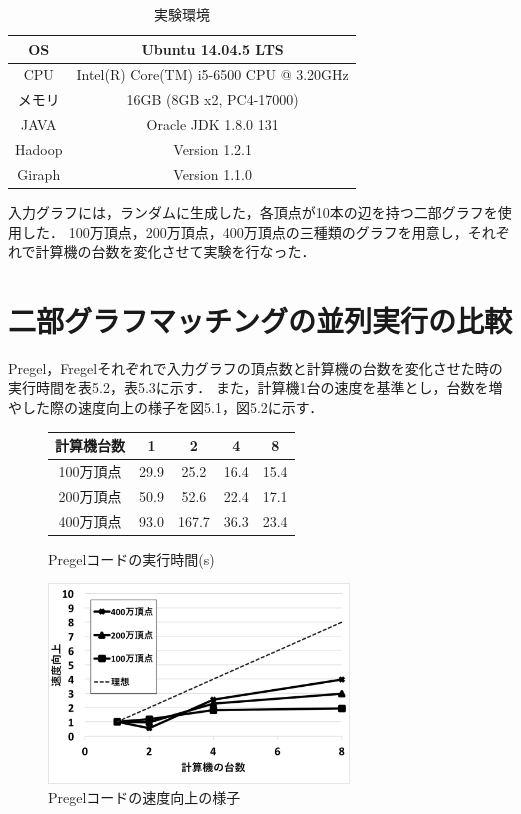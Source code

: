 \documentclass[12pt]{ujreport}
\begin{document}
\begin{table}[htb]
  \caption{実験環境}
  \centering
  \begin{tabular}{|c||c|} \hline
    OS & Ubuntu 14.04.5 LTS\\ \hline
    CPU & Intel(R) Core(TM) i5-6500 CPU @ 3.20GHz\\ \hline
    メモリ & 16GB (8GB x2, PC4-17000)\\ \hline
    JAVA & Oracle JDK 1.8.0 131\\ \hline
    Hadoop & Version 1.2.1\\ \hline
    Giraph & Version 1.1.0\\ \hline
  \end{tabular}
\end{table}

入力グラフには，ランダムに生成した，各頂点が10本の辺を持つ二部グラフを使用した．
100万頂点，200万頂点，400万頂点の三種類のグラフを用意し，それぞれで計算機の台数を変化させて実験を行なった．


\section{二部グラフマッチングの並列実行の比較}
Pregel，Fregelそれぞれで入力グラフの頂点数と計算機の台数を変化させた時の実行時間を表5.2，表5.3に示す．
また，計算機1台の速度を基準とし，台数を増やした際の速度向上の様子を図5.1，図5.2に示す．

\begin{figure}[ht]
  \begin{minipage}{0.5\textwidth}
    \begin{center}
      \makeatletter
      \def\@captype{table}
      \makeatother
      \begin{tabular}{|c||c|c|c|c|}\hline
        計算機台数 & 1 & 2 & 4 & 8\\ \hline
        100万頂点 & 29.9 & 25.2 & 16.4 & 15.4\\ \hline
        200万頂点 & 50.9 & 52.6 & 22.4 & 17.1\\ \hline
        400万頂点 & 93.0 & 167.7 & 36.3 & 23.4\\ \hline
      \end{tabular}
      \caption{Pregelコードの実行時間(s)}
    \end{center}
  \end{minipage}
  \begin{minipage}{0.7\textwidth}
    \begin{center}
      \includegraphics[width = 8cm]{kisuuPregel.png}
      \caption{Pregelコードの速度向上の様子}
    \end{center}
  \end{minipage}
\end{figure}
\end{document}
